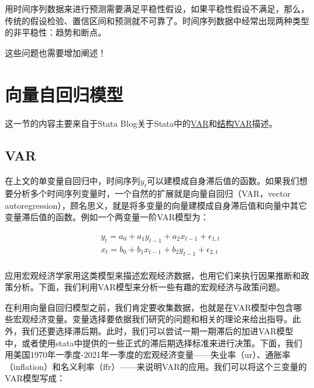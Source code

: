 \documentclass[cn,12pt,math=newtx,citestyle=gb7714-2015,bibstyle=gb7714-2015]{elegantbook}
\begin{document}
    用时间序列数据来进行预测需要满足平稳性假设，如果平稳性假设不满足，那么，传统的假设检验、置信区间和预测就不可靠了。时间序列数据中经常出现两种类型的非平稳性：趋势和断点。
    
    这些问题也需要增加阐述！
	
	\section{向量自回归模型}
	
	这一节的内容主要来自于Stata Blog关于Stata中的\href{https://blog.stata.com/2016/08/09/vector-autoregressions-in-stata/}{VAR}和\href{https://blog.stata.com/2016/09/20/structural-vector-autoregression-models/}{结构VAR}描述。
	
	\subsection{VAR}
	
	在上文的单变量自回归中，时间序列$y_t$可以建模成自身滞后值的函数。如果我们想要分析多个时间序列变量时，一个自然的扩展就是向量自回归（VAR，vector autoregression），顾名思义，就是将多变量的向量建模成自身滞后值和向量中其它变量滞后值的函数。例如一个两变量一阶VAR模型为：
	

		\begin{align*}
		&	y_t =a_0 +a_1 y_{t-1} +a_2 x_{t-1} +\epsilon_{1,t} \\
		&   x_t =b_0 +b_1 x_{t-1} +b_2 y_{t-1}+\epsilon_{2,t}\\	
		\end{align*}
    
    应用宏观经济学家用这类模型来描述宏观经济数据，也用它们来执行因果推断和政策分析。下面，我们利用VAR模型来分析一些有趣的宏观经济与政策问题。
    
    在利用向量自回归模型之前，我们肯定要收集数据，也就是在VAR模型中包含哪些宏观经济变量。变量选择要依据我们研究的问题和相关的理论来给出指导。此外，我们还要选择滞后期。此时，我们可以尝试一期一期滞后的加进VAR模型中，或者使用stata中提供的一些正式的滞后期选择标准来进行决策。下面，我们用美国1970年一季度-2021年一季度的宏观经济变量——失业率（ur）、通胀率（inflation）和名义利率（ffr）——来说明VAR的应用。我们可以将这个三变量的VAR模型写成：
    
\end{document}
